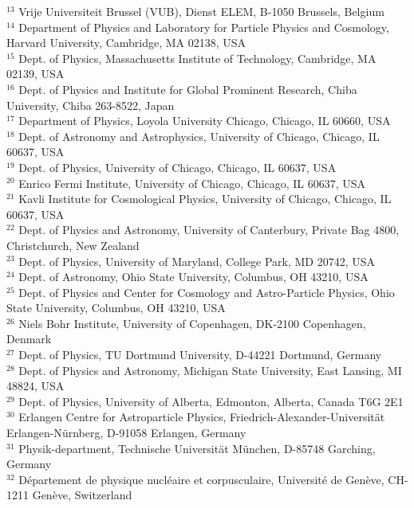 \documentclass[a4paper,11pt]{article}
\begin{document}
$^{13}$ Vrije Universiteit Brussel (VUB), Dienst ELEM, B-1050 Brussels, Belgium \\
$^{14}$ Department of Physics and Laboratory for Particle Physics and Cosmology, Harvard University, Cambridge, MA 02138, USA \\
$^{15}$ Dept. of Physics, Massachusetts Institute of Technology, Cambridge, MA 02139, USA \\
$^{16}$ Dept. of Physics and Institute for Global Prominent Research, Chiba University, Chiba 263-8522, Japan \\
$^{17}$ Department of Physics, Loyola University Chicago, Chicago, IL 60660, USA \\
$^{18}$ Dept. of Astronomy and Astrophysics, University of Chicago, Chicago, IL 60637, USA \\
$^{19}$ Dept. of Physics, University of Chicago, Chicago, IL 60637, USA \\
$^{20}$ Enrico Fermi Institute, University of Chicago, Chicago, IL 60637, USA \\
$^{21}$ Kavli Institute for Cosmological Physics, University of Chicago, Chicago, IL 60637, USA \\
$^{22}$ Dept. of Physics and Astronomy, University of Canterbury, Private Bag 4800, Christchurch, New Zealand \\
$^{23}$ Dept. of Physics, University of Maryland, College Park, MD 20742, USA \\
$^{24}$ Dept. of Astronomy, Ohio State University, Columbus, OH 43210, USA \\
$^{25}$ Dept. of Physics and Center for Cosmology and Astro-Particle Physics, Ohio State University, Columbus, OH 43210, USA \\
$^{26}$ Niels Bohr Institute, University of Copenhagen, DK-2100 Copenhagen, Denmark \\
$^{27}$ Dept. of Physics, TU Dortmund University, D-44221 Dortmund, Germany \\
$^{28}$ Dept. of Physics and Astronomy, Michigan State University, East Lansing, MI 48824, USA \\
$^{29}$ Dept. of Physics, University of Alberta, Edmonton, Alberta, Canada T6G 2E1 \\
$^{30}$ Erlangen Centre for Astroparticle Physics, Friedrich-Alexander-Universit{\"a}t Erlangen-N{\"u}rnberg, D-91058 Erlangen, Germany \\
$^{31}$ Physik-department, Technische Universit{\"a}t M{\"u}nchen, D-85748 Garching, Germany \\
$^{32}$ D{\'e}partement de physique nucl{\'e}aire et corpusculaire, Universit{\'e} de Gen{\`e}ve, CH-1211 Gen{\`e}ve, Switzerland \\
\end{document}
